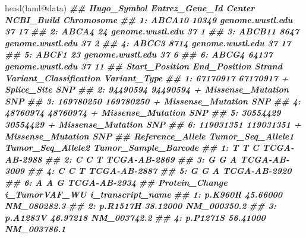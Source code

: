 \documentclass[
  12pt,
  a4paper,
  twoside]{book}
\newenvironment{Shaded}{\begin{snugshade}}{\end{snugshade}}
\newcommand{\DocumentationTok}[1]{\textcolor[rgb]{0.56,0.35,0.01}{\textbf{\textit{#1}}}}
\newcommand{\FunctionTok}[1]{\textcolor[rgb]{0.00,0.00,0.00}{#1}}
\newcommand{\NormalTok}[1]{#1}
\newcommand{\SpecialCharTok}[1]{\textcolor[rgb]{0.00,0.00,0.00}{#1}}
\begin{document}
\begin{Shaded}
\begin{Highlighting}[]
\FunctionTok{head}\NormalTok{(laml}\SpecialCharTok{@}\NormalTok{data)}
\DocumentationTok{\#\#    Hugo\_Symbol Entrez\_Gene\_Id           Center NCBI\_Build Chromosome}
\DocumentationTok{\#\# 1:      ABCA10          10349 genome.wustl.edu         37         17}
\DocumentationTok{\#\# 2:       ABCA4             24 genome.wustl.edu         37          1}
\DocumentationTok{\#\# 3:      ABCB11           8647 genome.wustl.edu         37          2}
\DocumentationTok{\#\# 4:       ABCC3           8714 genome.wustl.edu         37         17}
\DocumentationTok{\#\# 5:       ABCF1             23 genome.wustl.edu         37          6}
\DocumentationTok{\#\# 6:       ABCG4          64137 genome.wustl.edu         37         11}
\DocumentationTok{\#\#    Start\_Position End\_Position Strand Variant\_Classification Variant\_Type}
\DocumentationTok{\#\# 1:       67170917     67170917      +            Splice\_Site          SNP}
\DocumentationTok{\#\# 2:       94490594     94490594      +      Missense\_Mutation          SNP}
\DocumentationTok{\#\# 3:      169780250    169780250      +      Missense\_Mutation          SNP}
\DocumentationTok{\#\# 4:       48760974     48760974      +      Missense\_Mutation          SNP}
\DocumentationTok{\#\# 5:       30554429     30554429      +      Missense\_Mutation          SNP}
\DocumentationTok{\#\# 6:      119031351    119031351      +      Missense\_Mutation          SNP}
\DocumentationTok{\#\#    Reference\_Allele Tumor\_Seq\_Allele1 Tumor\_Seq\_Allele2 Tumor\_Sample\_Barcode}
\DocumentationTok{\#\# 1:                T                 T                 C         TCGA{-}AB{-}2988}
\DocumentationTok{\#\# 2:                C                 C                 T         TCGA{-}AB{-}2869}
\DocumentationTok{\#\# 3:                G                 G                 A         TCGA{-}AB{-}3009}
\DocumentationTok{\#\# 4:                C                 C                 T         TCGA{-}AB{-}2887}
\DocumentationTok{\#\# 5:                G                 G                 A         TCGA{-}AB{-}2920}
\DocumentationTok{\#\# 6:                A                 A                 G         TCGA{-}AB{-}2934}
\DocumentationTok{\#\#    Protein\_Change i\_TumorVAF\_WU i\_transcript\_name}
\DocumentationTok{\#\# 1:        p.K960R      45.66000       NM\_080282.3}
\DocumentationTok{\#\# 2:       p.R1517H      38.12000       NM\_000350.2}
\DocumentationTok{\#\# 3:       p.A1283V      46.97218       NM\_003742.2}
\DocumentationTok{\#\# 4:       p.P1271S      56.41000       NM\_003786.1}

\end{Highlighting}
\end{Shaded}
\end{document}
